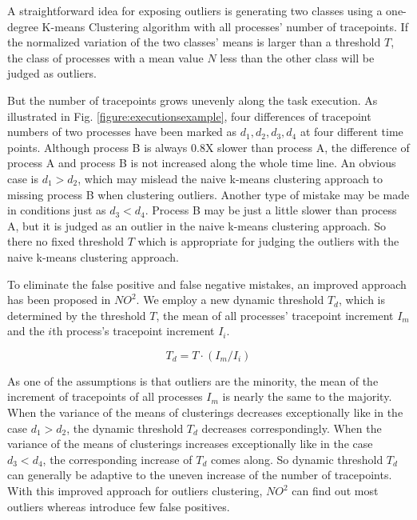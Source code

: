 A straightforward idea for exposing outliers is generating two classes using a one-degree K-means
Clustering algorithm with all processes' number of tracepoints. If the normalized
variation of the two classes' means is larger than a threshold $T$, the class of
processes with a mean value $N$ less than the other class will be judged as outliers.

But the number of tracepoints grows unevenly along the task execution.
As illustrated in Fig. \ref{figure:executionsexample}, four differences of tracepoint numbers of two processes have been
marked as $d_1, d_2, d_3, d_4$ at four different time points. Although process B is always
0.8X slower than process A, the difference of process A and process B is not increased
along the whole time line. An obvious case is $d_1 > d_2$, which may mislead the naive
k-means clustering approach to missing process B when clustering outliers. Another type of
mistake may be made in conditions just as $d_3 < d_4$. Process B may be just a little slower than
process A, but it is judged as an outlier in the naive k-means clustering approach. So there no
fixed threshold $T$ which is appropriate for judging the outliers with the naive k-means
clustering approach.

To eliminate the false positive and false negative mistakes, an improved approach
has been proposed in $NO^2$. We employ a new dynamic threshold $T_d$, which is
determined by the threshold $T$, the mean of all processes' tracepoint increment $I_m$
and the $i$th process's tracepoint increment $I_i$.

$$T_d = T \cdot (I_m / I_i)$$

As one of the assumptions is that outliers are the minority, the mean of the increment of
tracepoints of all processes $I_m$ is nearly the same to the majority. When the variance
of the means of clusterings decreases exceptionally like in the case $d_1 > d_2$, the dynamic
threshold $T_d$ decreases correspondingly. When the variance of the means of clusterings
increases exceptionally like in the case $d_3 < d_4$, the corresponding increase of $T_d$
comes along. So dynamic threshold $T_d$ can generally be adaptive to the uneven increase of the number
of tracepoints. With this improved approach for outliers clustering, $NO^2$
can find out most outliers whereas introduce few false positives. 
